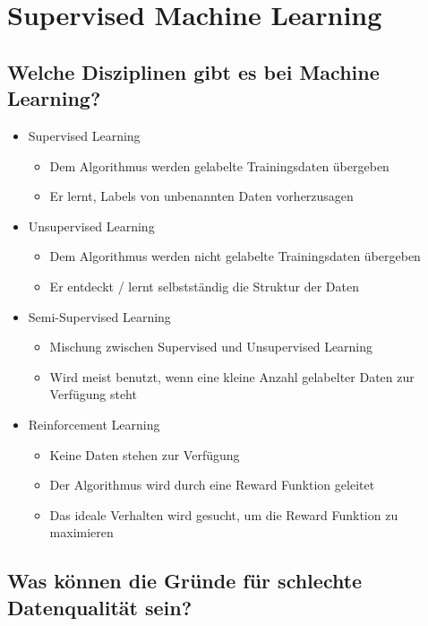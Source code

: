 \documentclass[a4paper]{article}
\begin{document}
	\newpage
	
	\section{Supervised Machine Learning}
	
		\subsection{Welche Disziplinen gibt es bei Machine Learning?}
		
		\begin{itemize}
			\item Supervised Learning
			\begin{itemize}
				\item Dem Algorithmus werden gelabelte Trainingsdaten übergeben
				\item Er lernt, Labels von unbenannten Daten vorherzusagen
			\end{itemize}
			\item Unsupervised Learning
			\begin{itemize}
				\item Dem Algorithmus werden nicht gelabelte Trainingsdaten übergeben
				\item Er entdeckt / lernt selbstständig die Struktur der Daten
			\end{itemize}
			\item Semi-Supervised Learning
			\begin{itemize}
				\item Mischung zwischen Supervised und Unsupervised Learning
				\item Wird meist benutzt, wenn eine kleine Anzahl gelabelter Daten zur Verfügung steht
			\end{itemize}
			\item Reinforcement Learning
			\begin{itemize}
				\item Keine Daten stehen zur Verfügung
				\item Der Algorithmus wird durch eine Reward Funktion geleitet
				\item Das ideale Verhalten wird gesucht, um die Reward Funktion zu maximieren
			\end{itemize}
		\end{itemize}
		
		\subsection{Was können die Gründe für schlechte Datenqualität sein?}
		
\end{document}
